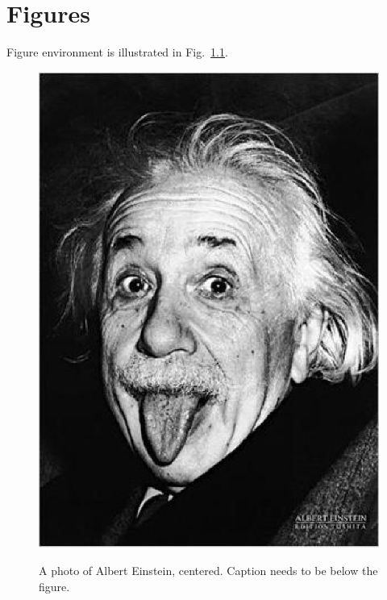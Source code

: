 \chapter{Figures}\label{Ch:Figures}

Figure environment is illustrated in Fig.~\ref{Fig:Einstein}.

\begin{figure}[ht]
  \centering
  \includegraphics{alberteinsteintongue.eps}\\
  \caption[This will be displayed on the List of Figures.]{A photo of Albert Einstein, centered.
  Caption needs to be below the figure.}\label{Fig:Einstein}
\end{figure}

